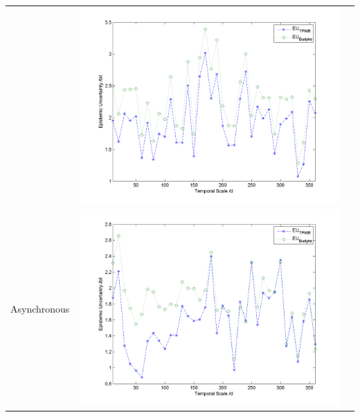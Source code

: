\documentclass[11pt]{article}
\begin{document}
\begin{table}[H]
{\begin{tabular}{ccc}
&\begin{minipage}{.6\textwidth}\includegraphics[width=\linewidth]{resultgraph/06810000EU.png}\end{minipage}
\\
Asynchronous
&\begin{minipage}{.6\textwidth}\includegraphics[width=\linewidth]{resultgraph/02143000EU.png}\end{minipage}
 

\end{tabular}}
\end{table}
\end{document}
